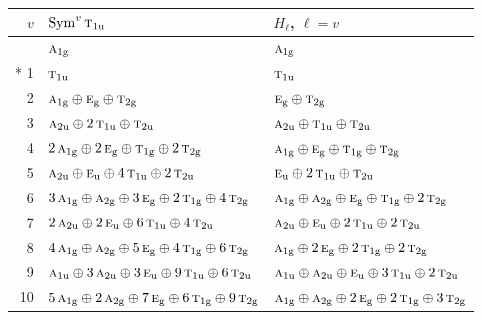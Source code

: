 \documentclass[10pt,a4paper]{article}
\numberwithin{equation}{section}
\newcommand{\irr}[1]{\text{\normalfont\scshape #1}}
\newcommand{\ptag}[1]{\mathrm{#1}}
\begin{document}
{\small\begin{longtable}{@{}rll@{}}\toprule
$v$ & $\operatorname{Sym}^{v}\irr{t}_{1\ptag{u}}$ & $H_\ell$, $\ell = v$\\\midrule\endhead
\bottomrule\endfoot\endlastfoot
0 & $\irr{a}_{1\ptag{g}}$ & $\irr{a}_{1\ptag{g}}$\\*
1 & $\irr{t}_{1\ptag{u}}$ & $\irr{t}_{1\ptag{u}}$\\
2 & $\irr{a}_{1\ptag{g}} \oplus \irr{e}_{\ptag{g}} \oplus \irr{t}_{2\ptag{g}}$ & $\irr{e}_{\ptag{g}} \oplus \irr{t}_{2\ptag{g}}$\\
3 & $\irr{a}_{2\ptag{u}} \oplus 2\,\irr{t}_{1\ptag{u}} \oplus \irr{t}_{2\ptag{u}}$ & $\irr{a}_{2\ptag{u}} \oplus \irr{t}_{1\ptag{u}} \oplus \irr{t}_{2\ptag{u}}$\\
4 & $2\,\irr{a}_{1\ptag{g}} \oplus 2\,\irr{e}_{\ptag{g}} \oplus \irr{t}_{1\ptag{g}} \oplus 2\,\irr{t}_{2\ptag{g}}$ & $\irr{a}_{1\ptag{g}} \oplus \irr{e}_{\ptag{g}} \oplus \irr{t}_{1\ptag{g}} \oplus \irr{t}_{2\ptag{g}}$\\
5 & $\irr{a}_{2\ptag{u}} \oplus \irr{e}_{\ptag{u}} \oplus 4\,\irr{t}_{1\ptag{u}} \oplus 2\,\irr{t}_{2\ptag{u}}$ & $\irr{e}_{\ptag{u}} \oplus 2\,\irr{t}_{1\ptag{u}} \oplus \irr{t}_{2\ptag{u}}$\\
6 & $3\,\irr{a}_{1\ptag{g}} \oplus \irr{a}_{2\ptag{g}} \oplus 3\,\irr{e}_{\ptag{g}} \oplus 2\,\irr{t}_{1\ptag{g}} \oplus 4\,\irr{t}_{2\ptag{g}}$ & $\irr{a}_{1\ptag{g}} \oplus \irr{a}_{2\ptag{g}} \oplus \irr{e}_{\ptag{g}} \oplus \irr{t}_{1\ptag{g}} \oplus 2\,\irr{t}_{2\ptag{g}}$\\
7 & $2\,\irr{a}_{2\ptag{u}} \oplus 2\,\irr{e}_{\ptag{u}} \oplus 6\,\irr{t}_{1\ptag{u}} \oplus 4\,\irr{t}_{2\ptag{u}}$ & $\irr{a}_{2\ptag{u}} \oplus \irr{e}_{\ptag{u}} \oplus 2\,\irr{t}_{1\ptag{u}} \oplus 2\,\irr{t}_{2\ptag{u}}$\\
8 & $4\,\irr{a}_{1\ptag{g}} \oplus \irr{a}_{2\ptag{g}} \oplus 5\,\irr{e}_{\ptag{g}} \oplus 4\,\irr{t}_{1\ptag{g}} \oplus 6\,\irr{t}_{2\ptag{g}}$ & $\irr{a}_{1\ptag{g}} \oplus 2\,\irr{e}_{\ptag{g}} \oplus 2\,\irr{t}_{1\ptag{g}} \oplus 2\,\irr{t}_{2\ptag{g}}$\\
9 & $\irr{a}_{1\ptag{u}} \oplus 3\,\irr{a}_{2\ptag{u}} \oplus 3\,\irr{e}_{\ptag{u}} \oplus 9\,\irr{t}_{1\ptag{u}} \oplus 6\,\irr{t}_{2\ptag{u}}$ & $\irr{a}_{1\ptag{u}} \oplus \irr{a}_{2\ptag{u}} \oplus \irr{e}_{\ptag{u}} \oplus 3\,\irr{t}_{1\ptag{u}} \oplus 2\,\irr{t}_{2\ptag{u}}$\\
10 & $5\,\irr{a}_{1\ptag{g}} \oplus 2\,\irr{a}_{2\ptag{g}} \oplus 7\,\irr{e}_{\ptag{g}} \oplus 6\,\irr{t}_{1\ptag{g}} \oplus 9\,\irr{t}_{2\ptag{g}}$ & $\irr{a}_{1\ptag{g}} \oplus \irr{a}_{2\ptag{g}} \oplus 2\,\irr{e}_{\ptag{g}} \oplus 2\,\irr{t}_{1\ptag{g}} \oplus 3\,\irr{t}_{2\ptag{g}}$\\

\end{longtable}}
\end{document}
